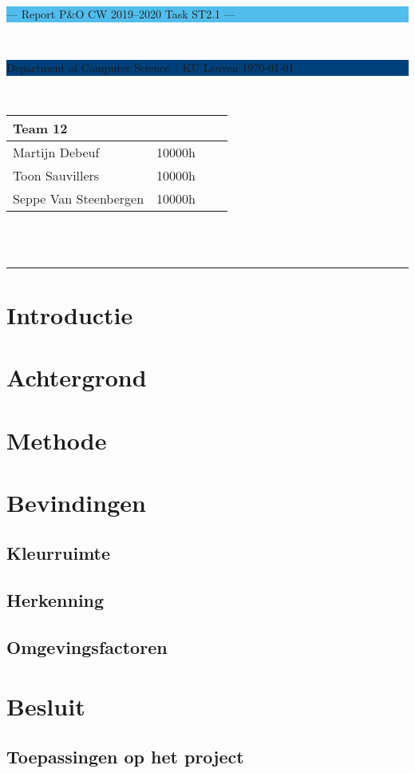 \documentclass[a4paper,11pt]{article}
\begin{document}
\noindent
\colorbox[HTML]{52BDEC}{\bfseries\parbox{\textwidth}{\centering\large
  --- Report P\&O CW 2019--2020 Task ST2.1 ---
}}
\\[-1mm]
\colorbox[HTML]{00407A}{\bfseries\color{white}\parbox{\textwidth}{
  Department of Computer Science -- KU Leuven
  \hfill
  \today
}}
\\

\smallskip

\noindent
\mbox{}\hfill
\begin{tabular}{*4l}
\toprule
\multicolumn{2}{l}{\large\textbf{Team 12}} \\
\midrule
Martijn Debeuf &  10000h\\ %
Toon Sauvillers &  10000h\\
Seppe Van Steenbergen & 10000h \\
\bottomrule
\hline
\end{tabular}\\
\\

\noindent
{\color[HTML]{52BDEC} \rule{\linewidth}{1mm} }

\section{Introductie}\label{sec:introductie}
	

\section{Achtergrond}\label{sec:achtergrond}
	

\section{Methode}\label{sec:methode}
	

\section{Bevindingen}\label{sec:bevindingen}
	

	\subsection{Kleurruimte}\label{subsec:kleurruimte}
		
	\subsection{Herkenning}\label{subsec:herkenning}
		
	\subsection{Omgevingsfactoren}\label{subsec:omgevingsfactoren}
		

\section{Besluit}\label{sec:besluit}
	
	
	\subsection{Toepassingen op het project}\label{subsec:toepassingen}
		
\end{document}
